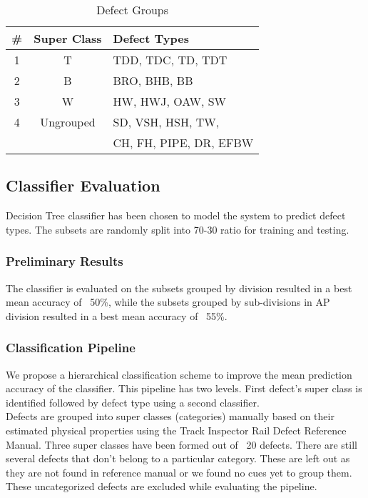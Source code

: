 \documentclass{sig-alternate-05-2015}
\begin{document}
\begin{table}
\centering
\caption{Defect Groups}
\begin{tabular}{|c|c|l|} \hline
\# & Super Class & Defect Types\\ \hline
1 & T & TDD, TDC, TD, TDT\\ \hline
2 & B & BRO, BHB, BB\\ \hline
3 & W & HW, HWJ, OAW, SW\\ \hline
4 & Ungrouped & SD, VSH, HSH, TW,\\
  & & CH, FH, PIPE, DR, EFBW\\
\hline\end{tabular}
\end{table}

\subsection{Classifier Evaluation}
Decision Tree classifier has been chosen to model the system to predict defect types. The subsets are randomly split into 70-30 ratio for training and testing. \\

\subsubsection{Preliminary Results}
The classifier is evaluated on the subsets grouped by division resulted in a best mean accuracy of ~50\%, while the subsets grouped by sub-divisions in AP division resulted in a best mean accuracy of ~55\%. 

\subsubsection{Classification Pipeline}
We propose a hierarchical classification scheme to improve the mean prediction accuracy of the classifier. This pipeline has two levels. First defect's super class is identified followed by defect type using a second classifier.\\

Defects are grouped into super classes (categories) manually based on their estimated physical properties using the Track Inspector Rail Defect Reference Manual. Three super classes have been formed out of ~20 defects. There are still several defects that don't belong to a particular category. These are left out as they are not found in reference manual or we found no cues yet to group them. These uncategorized defects are excluded while evaluating the pipeline.\\
\end{document}

